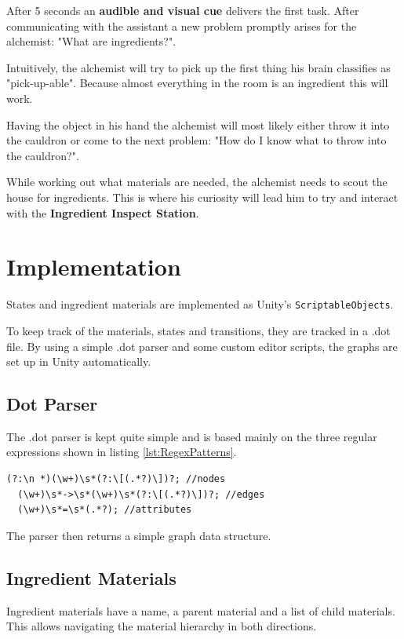 \documentclass{vgtc}
\begin{document}
After 5 seconds an \textbf{audible and visual cue} delivers the first task. After communicating with the assistant
a new problem promptly arises for the alchemist: "What are ingredients?".

Intuitively, the alchemist will try to pick up the first thing his brain classifies as "pick-up-able". Because
almost everything in the room is an ingredient this will work.

Having the object in his hand the alchemist will most likely either throw it into the cauldron or come to the next
problem: "How do I know what to throw into the cauldron?".

While working out what materials are needed, the alchemist needs to scout the house for ingredients. This is where
his curiosity will lead him to try and interact with the \textbf{Ingredient Inspect Station}.

\section{Implementation}

States and ingredient materials are implemented as Unity's \texttt{ScriptableObjects}.

To keep track of the materials, states and transitions, they are tracked in a .dot file. By using a simple .dot parser
and some custom editor scripts, the graphs are set up in Unity automatically.

\subsection{Dot Parser}

The .dot parser is kept quite simple and is based mainly on the three regular expressions shown in listing \ref{lst:RegexPatterns}.

\begin{lstlisting}[caption=Regex Patterns, label=lst:RegexPatterns]
  (?:\n *)(\w+)\s*(?:\[(.*?)\])?; //nodes
  (\w+)\s*->\s*(\w+)\s*(?:\[(.*?)\])?; //edges
  (\w+)\s*=\s*(.*?); //attributes
\end{lstlisting}

The parser then returns a simple graph data structure.

\subsection{Ingredient Materials}

Ingredient materials have a name, a parent material and a list of child materials. This allows navigating
the material hierarchy in both directions.
\end{document}
